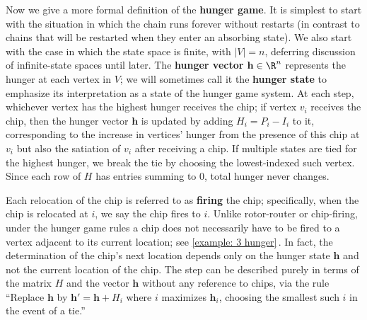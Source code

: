 Now we give a more formal definition of the \textbf{hunger game}.
It is simplest to start with the situation
in which the chain runs forever without restarts
(in contrast to chains that will be restarted 
when they enter an absorbing state).
We also start with the case in which the state space is finite,
with $|V| = n$, deferring discussion of infinite-state spaces until later.
The \textbf{hunger vector} $\mathbf{h}\in\R^{n}$ represents 
the hunger at each vertex in $V$;
we will sometimes call it the \textbf{hunger state} to emphasize 
its interpretation as a state of the hunger game system.
At each step, whichever vertex has the highest hunger receives the chip; 
if vertex $v_i$ receives the chip, then the hunger vector $\mathbf{h}$ 
is updated by adding $H_i = P_i - I_i$ to it, corresponding to 
the increase in vertices' hunger from the presence of this chip at $v_i$ 
but also the satiation of $v_i$ after receiving a chip.
If multiple states are tied for the highest hunger,
we break the tie by choosing the lowest-indexed such vertex.
Since each row of $H$ has entries summing to 0,
total hunger never changes.

Each relocation of the chip is referred to as \textbf{firing} the chip;
specifically, when the chip is relocated at $i$,
we say the chip fires to $i$.
Unlike rotor-router or chip-firing, 
under the hunger game rules a chip does not necessarily have to be fired 
to a vertex adjacent to its current location; see \cref{example: 3 hunger}\,.
In fact, the determination of the chip's next location depends 
only on the hunger state $\mathbf{h}$ and not the current location of the chip.
The step can be described purely in terms of
the matrix $H$ and the vector $\mathbf{h}$
without any reference to chips, via the rule
``Replace $\mathbf{h}$ by $\mathbf{h}' = \mathbf{h} + H_i$
where $i$ maximizes $\mathbf{h}_i$,
choosing the smallest such $i$ in the event of a tie.'' 

